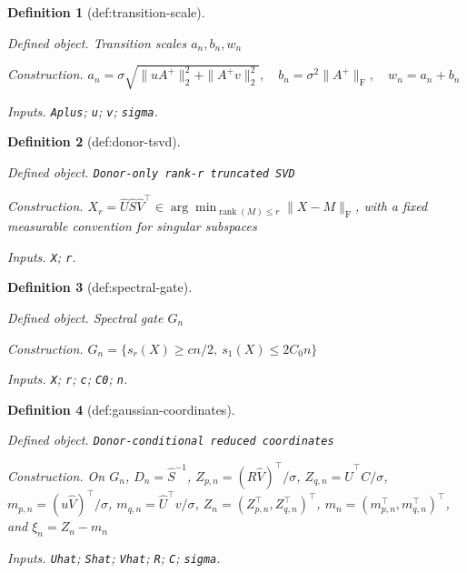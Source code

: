 \documentclass{article}
\newtheorem{definition}{Definition}
\begin{document}
\begin{definition}[def:transition-scale]\label{def:transition-scale}
\par\smallskip\noindent\emph{Defined object.} Transition scales \(a_n,b_n,w_n\)
\par\smallskip\noindent\emph{Construction.} \(a_n=\sigma\sqrt{\|uA^+\|_2^2+\|A^+v\|_2^2},\quad b_n=\sigma^2\|A^+\|_{\mathrm F},\quad w_n=a_n+b_n\)
\par\smallskip\noindent\emph{Inputs.} \texttt{Aplus}; \texttt{u}; \texttt{v}; \texttt{sigma}.
\end{definition}

\begin{definition}[def:donor-tsvd]\label{def:donor-tsvd}
\par\smallskip\noindent\emph{Defined object.} \texttt{Donor-\allowbreak{}only rank-\allowbreak{}r truncated SVD}
\par\smallskip\noindent\emph{Construction.} \(X_r=\widehat U\widehat S\widehat V^{\top}\in\arg\min_{\operatorname{rank}(M)\le r}\|X-M\|_{\mathrm F}\), with a fixed measurable convention for singular subspaces
\par\smallskip\noindent\emph{Inputs.} \texttt{X}; \texttt{r}.
\end{definition}

\begin{definition}[def:spectral-gate]\label{def:spectral-gate}
\par\smallskip\noindent\emph{Defined object.} Spectral gate \(G_n\)
\par\smallskip\noindent\emph{Construction.} \(G_n=\{s_r(X)\ge cn/2,\ s_1(X)\le2C_0n\}\)
\par\smallskip\noindent\emph{Inputs.} \texttt{X}; \texttt{r}; \texttt{c}; \texttt{C0}; \texttt{n}.
\end{definition}

\begin{definition}[def:gaussian-coordinates]\label{def:gaussian-coordinates}
\par\smallskip\noindent\emph{Defined object.} \texttt{Donor-\allowbreak{}conditional reduced coordinates}
\par\smallskip\noindent\emph{Construction.} On \(G_n\), \(D_n=\widehat S^{-1}\), \(Z_{p,n}=(R\widehat V)^{\top}/\sigma\), \(Z_{q,n}=\widehat U^{\top}C/\sigma\), \(m_{p,n}=(u\widehat V)^{\top}/\sigma\), \(m_{q,n}=\widehat U^{\top}v/\sigma\), \(Z_n=(Z_{p,n}^{\top},Z_{q,n}^{\top})^{\top}\), \(m_n=(m_{p,n}^{\top},m_{q,n}^{\top})^{\top}\), and \(\xi_n=Z_n-m_n\)
\par\smallskip\noindent\emph{Inputs.} \texttt{Uhat}; \texttt{Shat}; \texttt{Vhat}; \texttt{R}; \texttt{C}; \texttt{sigma}.
\end{definition}
\end{document}
